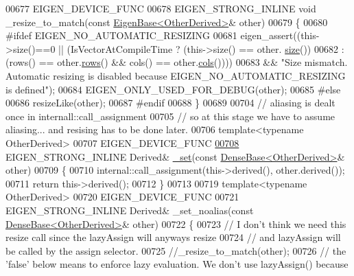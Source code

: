 \begin{DoxyCode}
00677     EIGEN\_DEVICE\_FUNC 
00678     EIGEN\_STRONG\_INLINE \textcolor{keywordtype}{void} \_resize\_to\_match(\textcolor{keyword}{const} \hyperlink{group___core___module_struct_eigen_1_1_eigen_base}{EigenBase<OtherDerived>}& other)
00679     \{
00680 \textcolor{preprocessor}{      #ifdef EIGEN\_NO\_AUTOMATIC\_RESIZING}
00681       eigen\_assert((this->size()==0 || (IsVectorAtCompileTime ? (this->size() == other.
      \hyperlink{group___core___module_ac2c9348df3bb9c0044dbae6c278a8977}{size}())
00682                  : (rows() == other.\hyperlink{group___core___module_a8141320ba8df384426c298b32b000d8e}{rows}() && cols() == other.\hyperlink{group___core___module_a7b0b45c7351847696c911ce8aa2abbdb}{cols}())))
00683         && \textcolor{stringliteral}{"Size mismatch. Automatic resizing is disabled because EIGEN\_NO\_AUTOMATIC\_RESIZING is defined"});
00684       EIGEN\_ONLY\_USED\_FOR\_DEBUG(other);
00685 \textcolor{preprocessor}{      #else}
00686       resizeLike(other);
00687 \textcolor{preprocessor}{      #endif}
00688     \}
00689 
00704     \textcolor{comment}{// aliasing is dealt once in internall::call\_assignment}
00705     \textcolor{comment}{// so at this stage we have to assume aliasing... and resising has to be done later.}
00706     \textcolor{keyword}{template}<\textcolor{keyword}{typename} OtherDerived>
00707     EIGEN\_DEVICE\_FUNC 
\hyperlink{class_eigen_1_1_plain_object_base_aa77dab5e9e6ba9e39740e17cfae78a33}{00708}     EIGEN\_STRONG\_INLINE Derived& \hyperlink{class_eigen_1_1_plain_object_base_aa77dab5e9e6ba9e39740e17cfae78a33}{\_set}(\textcolor{keyword}{const} \hyperlink{group___core___module_class_eigen_1_1_dense_base}{DenseBase<OtherDerived>}& other)
00709     \{
00710       internal::call\_assignment(this->derived(), other.derived());
00711       \textcolor{keywordflow}{return} this->derived();
00712     \}
00713 
00719     \textcolor{keyword}{template}<\textcolor{keyword}{typename} OtherDerived>
00720     EIGEN\_DEVICE\_FUNC 
00721     EIGEN\_STRONG\_INLINE Derived& \_set\_noalias(\textcolor{keyword}{const} \hyperlink{group___core___module_class_eigen_1_1_dense_base}{DenseBase<OtherDerived>}& other)
00722     \{
00723       \textcolor{comment}{// I don't think we need this resize call since the lazyAssign will anyways resize}
00724       \textcolor{comment}{// and lazyAssign will be called by the assign selector.}
00725       \textcolor{comment}{//\_resize\_to\_match(other);}
00726       \textcolor{comment}{// the 'false' below means to enforce lazy evaluation. We don't use lazyAssign() because}

\end{DoxyCode}
